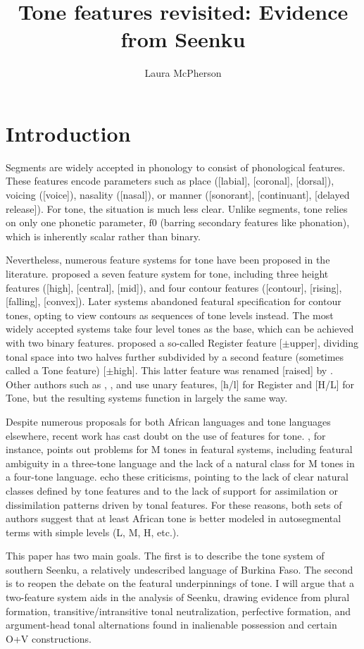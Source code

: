 \documentclass[output=paper]{langsci/langscibook}
\title{Tone features revisited: Evidence from Seenku}
\author{%
Laura McPherson \affiliation{Dartmouth College} 
}
\begin{document}
 \section{Introduction}
 \largerpage[-2] %
 Segments are widely accepted in phonology to consist of phonological features. These features encode parameters such as place ([labial], [coronal], [dorsal]), voicing ([voice]), nasality ([nasal]), or manner ([sonorant], [continuant], [delayed release]). For tone, the situation is much less clear. Unlike segments, tone relies on only one phonetic parameter, f0 (barring secondary features like phonation), which is inherently scalar rather than binary.
 
Nevertheless, numerous feature systems for tone have been proposed in the literature. \citet{Wang67} proposed a seven feature system for tone, including three height features ([high], [central], [mid]), and four contour features ([contour], [rising], [falling], [convex]). Later systems abandoned featural specification for contour tones, opting to view contours as sequences of tone levels instead. The most widely accepted systems take four level tones as the base, which can be achieved with two binary features. \citet{Yip80} proposed a so-called Register feature [$\pm$upper], dividing tonal space into two halves further subdivided by a second feature (sometimes called a Tone feature) [$\pm$high]. This latter feature was renamed [raised] by \citet{Pulleyblank86}. Other authors such as \citet{Clements83}, \citet{Snider90}, and \citet{Hyman93} use unary features, [h/l] for Register and [H/L] for Tone, but the resulting systems function in largely the same way.

Despite numerous proposals for both African languages and tone languages elsewhere, recent work has cast doubt on the use of features for tone. \citet{Hyman10b}, for instance, points out problems for M tones in featural systems, including featural ambiguity in a three-tone language and the lack of a natural class for M tones in a four-tone language. \citet{Clementsetal10} echo these criticisms, pointing to the lack of clear natural classes defined by tone features and to the lack of support for assimilation or dissimilation patterns driven by tonal features. For these reasons, both sets of authors suggest that at least African tone is better modeled in autosegmental terms with simple levels (L, M, H, etc.).

This paper has two main goals. The first is to describe the tone system of southern Seenku, a relatively undescribed  language of Burkina Faso. The second is to reopen the debate on the featural underpinnings of tone. I will argue that a two-feature system aids in the analysis of Seenku, drawing evidence from plural formation, transitive/intransitive tonal neutralization, perfective formation, and argument-head tonal alternations found in inalienable possession and certain O+V constructions.
\end{document}
